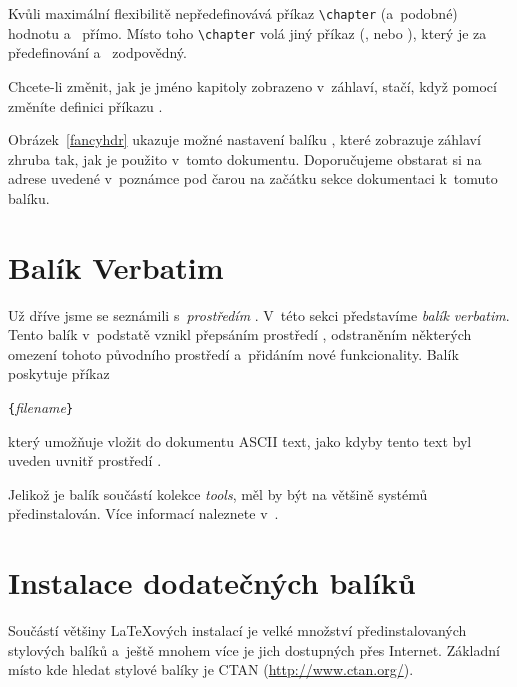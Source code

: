 Kvůli maximální flexibilitě nepředefinovává příkaz \verb|\chapter|
(a~podobné) hodnotu  a~ přímo. Místo toho
\verb|\chapter| volá jiný příkaz (,  nebo
), který je za předefinování 
a~ zodpovědný.

Chcete-li změnit, jak je jméno kapitoly zobrazeno v~záhlaví, stačí,
když pomocí  změníte definici příkazu .

Obrázek~\ref{fancyhdr} ukazuje možné nastavení balíku ,
které zobrazuje záhlaví zhruba tak, jak je použito v~tomto dokumentu.
Doporučujeme obstarat si na adrese uvedené v~poznámce pod čarou na
začátku sekce dokumentaci k~tomuto balíku.

\section{Balík Verbatim}

Už dříve jsme se seznámili s~\emph{prostředím} .
V~této sekci představíme \emph{balík} \emph{verbatim}. Tento
balík v~podstatě vznikl přepsáním prostředí ,
odstraněním některých omezení tohoto původního prostředí
a~přidáním nové funkcionality. Balík  poskytuje
příkaz

\begin{lscommand}
\verb|{|\emph{filename}\verb|}|
\end{lscommand}

\noindent který umožňuje vložit do dokumentu ASCII text, jako
kdyby tento text byl uveden uvnitř prostředí .

Jelikož je balík  součástí kolekce
\emph{tools}, měl by být na většině systémů předinstalován.
Více informací naleznete v~\cite{verbatim}.


\section{Instalace dodatečných balíků}\label{sec:Packages}

Součástí většiny \LaTeX ových instalací je velké množství
předinstalovaných stylových balíků a~ještě mnohem více je jich
dostupných přes Internet. Základní místo kde hledat stylové
balíky je CTAN (\url{http://www.ctan.org/}).

